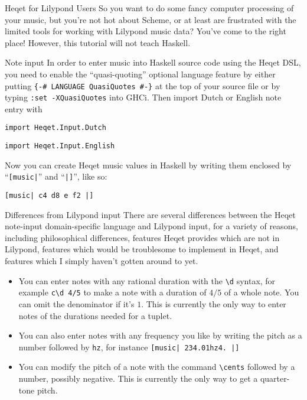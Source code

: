 \documentclass{article}
\begin{document}
\begin{section}{Heqet for Lilypond Users}
So you want to do some fancy computer processing of your music, but you're not hot about Scheme, or at least are frustrated with the limited tools for working with Lilypond music data? You've come to the right place! However, this tutorial will not teach Haskell. 

\begin{subsection}{Note input}
In order to enter music into Haskell source code using the Heqet DSL, you need to enable the  ``quasi-quoting'' optional language feature by either putting \verb+{-# LANGUAGE QuasiQuotes #-}+ at the top of your source file or by typing \verb+:set -XQuasiQuotes+ into GHCi. Then import Dutch or English note entry with 

\verb+import Heqet.Input.Dutch+

\verb+import Heqet.Input.English+

Now you can create Heqet music values in Haskell by writing them enclosed by ``\verb+[music|+'' and ``\verb+|]+'', like so: 

\verb+[music| c4 d8 e f2 |]+

\end{subsection}

\begin{subsection}{Differences from Lilypond input}
There are several differences between the Heqet note-input domain-specific language and Lilypond input, for a variety of reasons, including philosophical differences, features Heqet provides which are not in Lilypond, features which would be troublesome to implement in Heqet, and features which I simply haven't gotten around to yet. 
\begin{itemize}
\item You can enter notes with any rational duration with the \verb+\d+ syntax, for example \verb+c\d 4/5+ to make a note with a duration of $4/5$ of a whole note. You can omit the denominator if it's $1$. This is currently the only way to enter notes of the durations needed for a tuplet.

\item You can also enter notes with any frequency you like by writing the pitch as a number followed by  \verb+hz+, for instance \verb+[music| 234.01hz4. |]+

\item You can modify the pitch of a note with the command \verb+\cents+ followed by a number, possibly negative. This is currently the only way to get a quarter-tone pitch.


\end{itemize}
\end{subsection}
\end{section}
\end{document}
